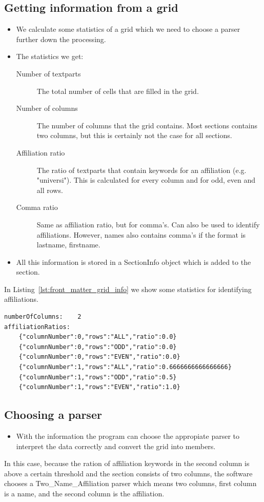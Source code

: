 \documentclass{ou-report}
\begin{document}
\subsection{Getting information from a grid}
\begin{itemize}
    \item We calculate some statistics of a grid which we need to choose a
        parser further down the processing.
    \item The statistics we get:
    \begin{description}
        \item[Number of textparts] The total number of cells that are filled in
            the grid.
        \item[Number of columns] The number of columns that the grid contains.
            Most sections contains two columns, but this is certainly not the 
            case for all sections.
        \item[Affiliation ratio] The ratio of textparts that contain keywords 
            for an affiliation (e.g. "universi"). This is calculated for every 
            column and for odd, even and all rows.
        \item[Comma ratio] Same as affiliation ratio, but for comma's. Can also
            be used to identify affiliations. However, names also contains 
            comma's if the format is lastname, firstname.
    \end{description}
    \item All this information is stored in a SectionInfo object which is added
        to the section.
\end{itemize}
In Listing~\ref{lst:front_matter_grid_info} we show some statistics for 
identifying affiliations.
\begin{lstlisting}[caption={Some derived information from the grid},captionpos=b,label={lst:front_matter_grid_info}]
numberOfColumns:	2
affiliationRatios:
	{"columnNumber":0,"rows":"ALL","ratio":0.0}
	{"columnNumber":0,"rows":"ODD","ratio":0.0}
	{"columnNumber":0,"rows":"EVEN","ratio":0.0}
	{"columnNumber":1,"rows":"ALL","ratio":0.6666666666666666}
	{"columnNumber":1,"rows":"ODD","ratio":0.5}
	{"columnNumber":1,"rows":"EVEN","ratio":1.0}
\end{lstlisting}

\subsection{Choosing a parser}
\begin{itemize}
    \item With the information the program can choose the appropiate parser to
        interpret the data correctly and convert the grid into members.
\end{itemize}
In this case, because the ration of affiliation keywords in the second column is 
above a certain threshold and the section consists of two columns, the software 
chooses a Two\_Name\_Affiliation parser which means two columns, first column is a 
name, and the second column is the affiliation.
\end{document}
